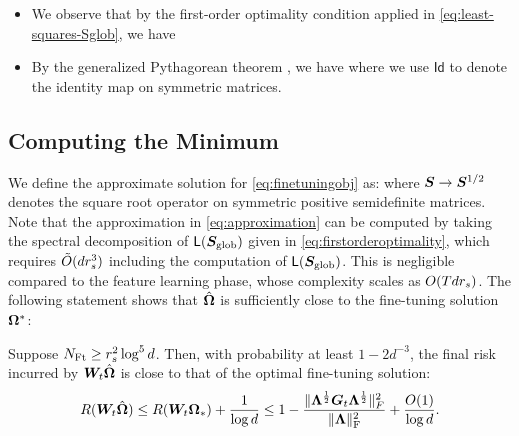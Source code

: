 \begin{itemize}[leftmargin=*]
\item  We observe that by the first-order optimality condition applied in \eqref{eq:least-squares-Sglob}, we have
\item By the generalized Pythagorean theorem \cite[Lemma 3.1]{Bubeck2014ConvexOA}, we have
where we use $\mathsf{Id}$ to denote  the identity map on symmetric matrices.
\end{itemize}



\subsection{Computing the Minimum}
We define the approximate solution for \eqref{eq:finetuningobj} as:
where  $\boldsymbol{S} \to \boldsymbol{S}^{1/2}$ denotes the square root operator on symmetric positive semidefinite matrices.   Note that the approximation in \eqref{eq:approximation} can be computed by taking the spectral decomposition of $\mathsf{L}(\boldsymbol{S}_{\mathrm{glob}})$ given in \eqref{eq:firstorderoptimality}, which requires $\tilde{O}(d r_s^3)$ including the computation of $\mathsf{L}(\boldsymbol{S}_{\mathrm{glob}})$. This is negligible compared to the feature learning phase, whose complexity scales as $O(T d r_s)$.  The following statement shows that $\hat{\boldsymbol{\Omega}}$ is sufficiently close to the fine-tuning solution $\boldsymbol{\Omega}^*$:

\begin{proposition}
\label{prop:finetuningappendix}
Suppose $N_{\mathrm{Ft}} \geq r_s^2 \log^5 d$. Then, with probability at least $1 - 2 d^{-3}$,  the final risk incurred by $\boldsymbol{W}_t \hat{\boldsymbol{\Omega}}$ is close to that of the optimal fine-tuning solution:
\begin{equation}
R(\boldsymbol{W}_t \hat{\boldsymbol{\Omega}}) \leq R(\boldsymbol{W}_t \boldsymbol{\Omega}_*) + \frac{1}{\log d} \leq 1 - \frac{\lVert\boldsymbol{\Lambda}^{\frac{1}{2}} \boldsymbol{G}_t \boldsymbol{\Lambda}^{\frac{1}{2}}\rVert_F^2}{\lVert\boldsymbol{\Lambda}\rVert_\mathrm{F}^2}  + \frac{O(1)}{\log d}.
\end{equation}
\end{proposition}



